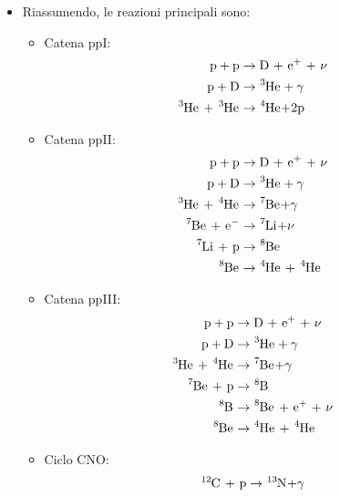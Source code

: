 \documentclass[a4paper,11pt]{article}
\theoremstyle{theorem}
\theoremstyle{definition}
\begin{document}
\begin{itemize}
		\item Riassumendo, le reazioni principali sono:
		\begin{itemize}
			\item Catena ppI:
			\begin{align*}\mathrm{p + p}&\rightarrow\textrm{D + e$^+$ + $\nu$}\\
			\mathrm{p + D}&\rightarrow\tensor[^3]{\mathrm{He}}{}+\gamma\\
			\tensor[^3]{\mathrm{He}}{}\textrm{ + }\tensor[^3]{\mathrm{He}}{}&\rightarrow\tensor[^4]{\mathrm{He}}{}\mathrm{ + 2p}
			\end{align*}
			\item Catena ppII:
			\begin{align*}\mathrm{p + p}&\rightarrow\textrm{D + e$^+$ + $\nu$}\\
			\mathrm{p + D}&\rightarrow\tensor[^3]{\mathrm{He}}{}+\gamma\\
			\tensor[^3]{\mathrm{He}}{}\textrm{ + }\tensor[^4]{\mathrm{He}}{}&\rightarrow\tensor[^7]{\mathrm{Be}}{}\mathrm{ + }\gamma\\
			\tensor[^7]{\mathrm{Be}}{}\textrm{ + e$^-$}&\rightarrow\tensor[^7]{\mathrm{Li}}{}\mathrm{ + }\nu\\
			\tensor[^7]{\mathrm{Li}}{}\textrm{ + p}&\rightarrow\tensor[^8]{\mathrm{Be}}{}\\
			\tensor[^8]{\mathrm{Be}}{}&\rightarrow\tensor[^4]{\mathrm{He}}{}\textrm{ + }\tensor[^4]{\mathrm{He}}{}
			\end{align*}
			\item Catena ppIII:
			\begin{align*}\mathrm{p + p}&\rightarrow\textrm{D + e$^+$ + $\nu$}\\
			\mathrm{p + D}&\rightarrow\tensor[^3]{\mathrm{He}}{}+\gamma\\
			\tensor[^3]{\mathrm{He}}{}\textrm{ + }\tensor[^4]{\mathrm{He}}{}&\rightarrow\tensor[^7]{\mathrm{Be}}{}\mathrm{ + }\gamma\\
			\tensor[^7]{\mathrm{Be}}{}\textrm{ + p}&\rightarrow\tensor[^8]{\mathrm{B}}{}\\
			\tensor[^8]{\mathrm{B}}{}&\rightarrow\tensor[^8]{\mathrm{Be}}{}\textrm{ + e$^+$ + $\nu$}\\
			\tensor[^8]{\mathrm{Be}}{}&\rightarrow\tensor[^4]{\mathrm{He}}{}\textrm{ + }\tensor[^4]{\mathrm{He}}{}
			\end{align*}
			\item Ciclo CNO:
			\begin{align*}
			\tensor[^{12}]{\mathrm{C}}{}\textrm{ + p}&\rightarrow\tensor[^{13}]{\mathrm{N}}{}\mathrm{ + }\gamma\\

\end{align*}
\end{itemize}
\end{itemize}
\end{document}

